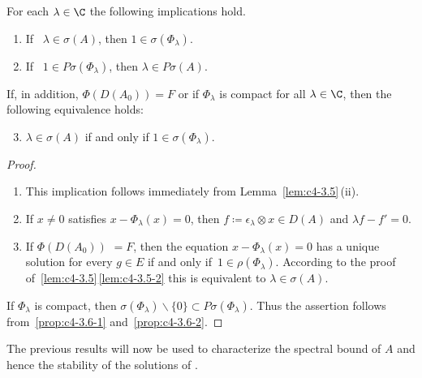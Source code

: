 \begin{proposition}\label{prop:c4-3.6}
For each $\lambda \in \C$ the following implications hold.
\begin{enumerate}[\upshape (i)]
\item \label{prop:c4-3.6-1}
If \, $\lambda \in \sigma(A)$, then $1 \in \sigma(\Phi_{\lambda})$.
\item \label{prop:c4-3.6-2}
If \, $1 \in P\sigma(\Phi_{\lambda})$, then $\lambda \in P\sigma(A)$.
\end{enumerate}
If, in addition, $\Phi(D(A_{0})) = F$ or if\/ $\Phi_{\lambda}$ is compact for all $\lambda \in \C$, then the following equivalence holds:
\begin{enumerate}[\upshape (i)]
\setcounter{enumi}{2}
\item \label{prop:c4-3.6-3}
$\lambda \in \sigma(A)$ if and only if\/ $1 \in \sigma(\Phi_{\lambda})$.
\end{enumerate}
\end{proposition}
\begin{proof}
\begin{enumerate}[\upshape (i), wide, labelindent=.25em] 
\item 
This implication follows immediately from Lemma~\ref{lem:c4-3.5}\,(ii).

\item 
If\/ $x \neq 0$ satisfies $x - \Phi_{\lambda}(x) = 0$, then $f \coloneq  \epsilon_{\lambda} \otimes x \in D(A)$ and $\lambda f - f' = 0$.

\item 
If\/ $\Phi(D(A_{0}))$ $= F$,  then the equation $x - \Phi_{\lambda}(x) = 0$ has a
unique solution for every $g \in E$ if and only if\, $1 \in \rho(\Phi_{\lambda})$. 
According to the proof of~\ref{lem:c4-3.5}\,\ref{lem:c4-3.5-2} this is equivalent to $\lambda \in \sigma(A)$.
\end{enumerate}
If\/ $\Phi_{\lambda}$ is compact, then $\sigma(\Phi_{\lambda})\backslash\{0\} \subset P\sigma(\Phi_{\lambda})$. Thus the assertion follows from~\ref{prop:c4-3.6-1} and~\ref{prop:c4-3.6-2}.
\end{proof}
The previous results will now be used to characterize the spectral bound of\/ $A$ and hence the stability of the solutions of .

